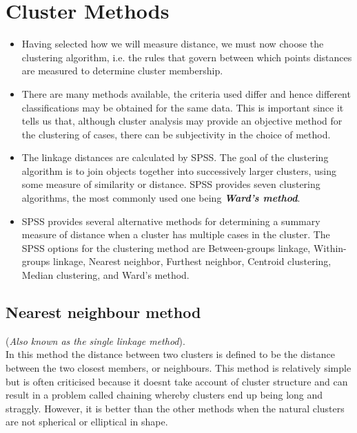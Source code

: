 \documentclass[a4paper,12pt]{article}
\begin{document}


\section{Cluster Methods}
\begin{itemize}
\item Having selected how we will measure distance, we must now choose the clustering algorithm, i.e. the rules that govern between which points distances are measured to determine cluster membership. 
\item There are many methods available, the criteria used differ and hence
different classifications may be obtained for the same data. This is important since it tells us that, although cluster analysis may provide an objective method for the clustering of cases, there can be subjectivity in the choice of method. 

\item The linkage distances are calculated by SPSS. The goal of the clustering algorithm is to join objects together into successively larger clusters, using some measure of similarity or distance. SPSS provides seven clustering algorithms, the most commonly used one being  \textbf{\textit{Ward's method}}.

\item SPSS provides several alternative methods for determining a summary measure of distance when a cluster has multiple cases in the cluster.  The SPSS options for the clustering method are Between-groups linkage, Within-groups linkage, Nearest neighbor, Furthest neighbor, Centroid clustering, Median clustering, and Ward's method.

\end{itemize}



\subsection{Nearest neighbour method} 
(\textit{Also known as the single linkage method}).\\
In this method the distance between two clusters is defined to be the distance between
the two closest members, or neighbours. This method is relatively simple but is often
criticised because it doesnt take account of cluster structure and can result in a problem
called chaining whereby clusters end up being long and straggly. However, it is better
than the other methods when the natural clusters are not spherical or elliptical in shape.
\end{document}
